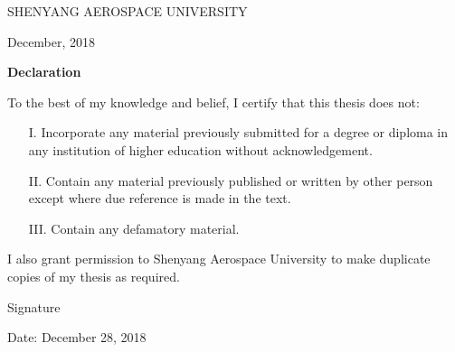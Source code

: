 \documentclass[12pt,a4paper]{article}
\newcommand\fillin[1][3cm]{\makebox[#1]{\dotfill}}
\begin{document}
\begin{titlepage}
\begin{table}[ht]
\begin{tabular}{M{4cm}M{8cm}N}
	\end{tabular}
	\end{table}	
	
	\newpage
	{\fontsize{18}{5}\selectfont \begin{center}
	\MakeUppercase{Shenyang Aerospace University}
	\end{center} \par}
	\vspace{0.15cm}

	{\fontsize{16}{5}\selectfont \begin{center}
	December, 2018
	\end{center}\par}
	\vspace{0.15cm}
	{\fontsize{16}{5}\selectfont \begin{center}
	\textbf{Declaration}
	\end{center}\par}
	\vspace{1cm} 

\RaggedRight \fontsize{14}{10}\selectfont To the best of my knowledge and belief, I certify that this thesis does not:\\
\begin{itemize}
	\item[I.] Incorporate any material previously submitted for a degree or diploma in any institution of higher education without acknowledgement.
	\item[II.] Contain any material previously published or written by other person except where due reference is made in the text.
	\item[III.] Contain any defamatory material.
\end{itemize}
I also grant permission to Shenyang Aerospace University to make duplicate copies of my thesis as required.	\\
\vspace{1cm}
\thispagestyle{empty}

\begin{flushleft}
Signature\fillin[4cm]
\end{flushleft}
Date: December 28, 2018 
	
\end{titlepage}	
\end{document}
